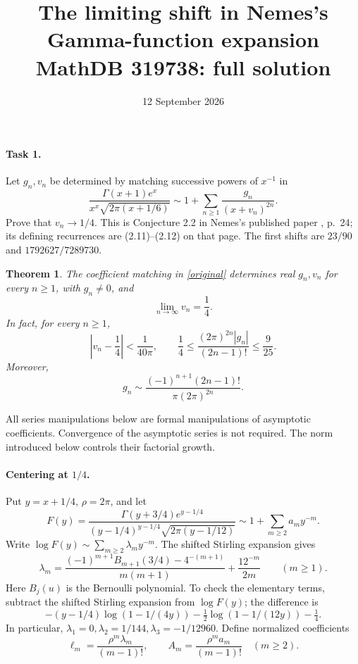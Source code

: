 \documentclass[11pt]{article}
\title{The limiting shift in Nemes's Gamma-function expansion\\
\large MathDB 319738: full solution}
\author{}
\date{12 September 2026}
\newtheorem{theorem}{Theorem}
\begin{document}
\maketitle

\paragraph{Task 1.}
Let \(g_n,v_n\) be determined by matching successive powers of \(x^{-1}\) in
\begin{equation}\label{original}
\frac{\Gamma(x+1)e^x}{x^x\sqrt{2\pi(x+1/6)}}
\sim 1+\sum_{n\ge1}\frac{g_n}{(x+v_n)^{2n}}.
\end{equation}
Prove that \(v_n\to1/4\). This is Conjecture 2.2 in Nemes's published
paper \cite{Nemes}, p.~24; its defining recurrences are (2.11)--(2.12)
on that page. The first shifts are \(23/90\) and \(1792627/7289730\).

\begin{theorem}\label{main}
The coefficient matching in \eqref{original} determines real \(g_n,v_n\)
for every \(n\ge1\), with \(g_n\ne0\), and
\[
 \lim_{n\to\infty}v_n=\frac14.
\]
In fact, for every \(n\ge1\),
\[
 \left|v_n-\frac14\right|<\frac1{40\pi},
 \qquad
 \frac14\le\frac{(2\pi)^{2n}|g_n|}{(2n-1)!}\le\frac9{25}.
\]
Moreover,
\[
 g_n\sim\frac{(-1)^{n+1}(2n-1)!}{\pi(2\pi)^{2n}}.
\]
\end{theorem}

All series manipulations below are formal manipulations of asymptotic
coefficients. Convergence of the asymptotic series is not required.
The norm introduced below controls their factorial growth.

\paragraph{Centering at \(1/4\).}
Put \(y=x+1/4\), \(\rho=2\pi\), and let
\[
 F(y)=\frac{\Gamma(y+3/4)e^{y-1/4}}
 {(y-1/4)^{y-1/4}\sqrt{2\pi(y-1/12)}}
 \sim 1+\sum_{m\ge2}a_m y^{-m}.
\]
Write \(\log F(y)\sim\sum_{m\ge2}\lambda_m y^{-m}\).
The shifted Stirling expansion \cite[Eq.~5.11.8]{DLMF} gives
\begin{equation}\label{lambda}
 \lambda_m=
 \frac{(-1)^{m+1}B_{m+1}(3/4)-4^{-(m+1)}}{m(m+1)}
 +\frac{12^{-m}}{2m}\qquad(m\ge1).
\end{equation}
Here \(B_j(u)\) is the Bernoulli polynomial. To check the elementary
terms, subtract the shifted Stirling expansion from \(\log F(y)\);
the difference is
\[
 -(y-1/4)\log(1-1/(4y))-\tfrac12\log(1-1/(12y))-\tfrac14.
\]
In particular, \(\lambda_1=0,\lambda_2=1/144,\lambda_3=-1/12960\).
Define normalized coefficients
\[
 \ell_m=\frac{\rho^m\lambda_m}{(m-1)!},
 \qquad A_m=\frac{\rho^m a_m}{(m-1)!}\quad(m\ge2).
\]
\end{document}
